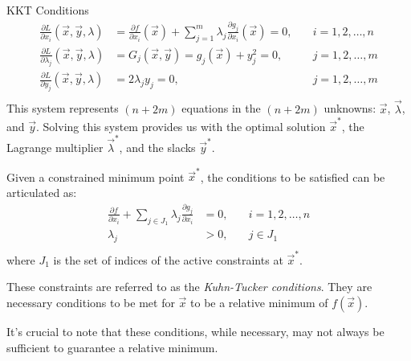 \documentclass[
    NAME={Dr. Helga Ingimundardóttir},
    EMAIL={helgaingim@hi.is},
    FACULTY={Industrial Engineering},
    TITLE={Nonlinear Optimization},
    SUBTITLE={Approaches and Challenges},
    SEMINAR={VÉL113F},
    DATE={Design and Optimization}
]{../HI-latex/hi-beamer}
\begin{document}
\begin{frame}{KKT Conditions}
        \begin{align*}
            \frac{\partial L}{\partial x_i}(\vec{x},\vec{y},\lambda) &= \frac{\partial f}{\partial x_i}(\vec{x}) + \sum_{j=1}^m \lambda_j \frac{\partial g_j}{\partial x_i}(\vec{x}) = 0, \quad &i = 1,2,\ldots,n \\
            \frac{\partial L}{\partial \lambda_j}(\vec{x},\vec{y},\lambda) &= G_j(\vec{x},\vec{y}) = g_j(\vec{x}) + y_j^2 = 0, \quad &j = 1,2,\ldots,m \\
            \frac{\partial L}{\partial y_j}(\vec{x},\vec{y},\lambda) &= 2\lambda_j y_j = 0, \quad &j = 1,2,\ldots,m \\
        \end{align*}
        This system represents \( (n + 2m) \) equations in the \( (n + 2m) \) unknowns: \( \vec{x} \), \( \vec{
            \lambda} \), and \( \vec{y} \).
        Solving this system provides us with the optimal solution \( \vec{x}^* \), the Lagrange multiplier \( \vec{
            \lambda}^* \), and the slacks \( \vec{y}^* \).

        \framebreak

        Given a constrained minimum point \( \vec{x}^* \), the conditions to be satisfied can be articulated as:
        \begin{align*}
            \frac{\partial f}{\partial x_i} + \sum_{j \in J_1} \lambda_j \frac{\partial g_j}{\partial x_i} &= 0, \quad &i = 1, 2, \ldots, n \\
            \lambda_j &> 0, \quad &j \in J_1 \\
        \end{align*}
        where $J_1$ is the set of indices of the active constraints at \( \vec{x}^* \).

        These constraints are referred to as the \emph{Kuhn-Tucker conditions}. They are necessary conditions to be
        met for \( \vec{x} \) to be a relative minimum of \( f(\vec{x}) \).

        \bigskip

        It's crucial to note that these conditions, while necessary, may not always be sufficient to guarantee a relative minimum.

    \end{frame}
\end{document}
